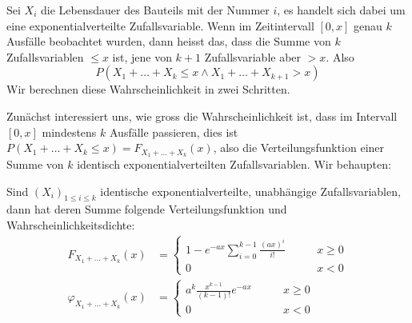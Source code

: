 Sei $X_i$ die Lebensdauer des Bauteils mit der Nummer $i$, es handelt
sich dabei um eine exponentialverteilte Zufallsvariable.
Wenn im Zeitintervall
$[0,x]$ genau $k$ Ausfälle beobachtet wurden, dann heisst das, dass die
Summe von $k$ Zufallsvariablen $\le x$ ist, jene von $k+1$ Zufallsvariable
aber $>x$.
Also
\[
P(X_1+\dots+X_k\le x \wedge X_1+\dots+X_{k+1}>x)
\]
Wir berechnen diese Wahrscheinlichkeit in zwei Schritten.

Zunächst interessiert uns, wie gross die Wahrscheinlichkeit ist, dass im
Intervall $[0,x]$ mindestens $k$ Ausfälle passieren, dies ist
$P(X_1+\dots+X_k\le x)=F_{X_1+\dots+X_k}(x)$, also die Verteilungsfunktion
einer Summe von $k$ identisch exponentialverteilten Zufallsvariablen.
Wir behaupten:
\begin{satz}Sind $(X_i)_{1\le i\le k}$ identische exponentialverteilte,
unabhängige Zufallsvariablen, dann hat deren Summe folgende Verteilungsfunktion
und Wahrscheinlichkeitsdichte:
\begin{align*}
F_{X_1+\dots+X_k}(x)&=\begin{cases}
{\displaystyle 1-e^{-ax}\sum_{i=0}^{k-1}\frac{(ax)^i}{i!}}&\qquad x \ge 0\\
0&\qquad x < 0
\end{cases}
\\
\varphi_{X_1+\dots+X_k}(x)&=\begin{cases}
{\displaystyle a^k\frac{x^{k-1}}{(k-1)!}e^{-ax}}&\qquad x\ge0\\
0&\qquad x < 0\end{cases}
\end{align*}
\end{satz}
